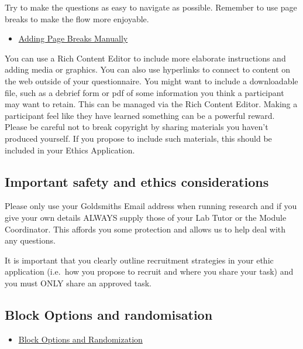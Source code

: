 \documentclass[
  letterpaper,
  DIV=11,
  numbers=noendperiod]{scrartcl}
\providecommand{\tightlist}{%
  \setlength{\itemsep}{0pt}\setlength{\parskip}{0pt}}\usepackage{longtable,booktabs,array}
\begin{document}
Try to make the questions as easy to navigate as possible. Remember to
use page breaks to make the flow more enjoyable.

\begin{itemize}
\tightlist
\item
  \href{https://www.qualtrics.com/support/survey-platform/survey-module/editing-questions/add-page-break/?parent=p0030\#AddingPageBreaksManually}{Adding
  Page Breaks Manually}
\end{itemize}

You can use a Rich Content Editor to include more elaborate instructions
and adding media or graphics. You can also use hyperlinks to connect to
content on the web outside of your questionnaire. You might want to
include a downloadable file, such as a debrief form or pdf of some
information you think a participant may want to retain. This can be
managed via the Rich Content Editor. Making a participant feel like they
have learned something can be a powerful reward. Please be careful not
to break copyright by sharing materials you haven't produced yourself.
If you propose to include such materials, this should be included in
your Ethics Application.

\subsection{Important safety and ethics
considerations}\label{important-safety-and-ethics-considerations}

Please only use your Goldsmiths Email address when running research and
if you give your own details ALWAYS supply those of your Lab Tutor or
the Module Coordinator. This affords you some protection and allows us
to help deal with any questions.

It is important that you clearly outline recruitment strategies in your
ethic application (i.e.~how you propose to recruit and where you share
your task) and you must ONLY share an approved task.

\subsection{Block Options and
randomisation}\label{block-options-and-randomisation}

\begin{itemize}
\tightlist
\item
  \href{https://www.qualtrics.com/support/survey-platform/survey-module/block-options/block-options-overview/?parent=p00101}{Block
  Options and Randomization}
\end{itemize}
\end{document}
